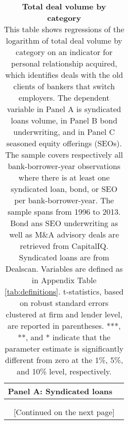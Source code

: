 \begin{table}[H] \begin{center} 
	\caption{\textbf{Total deal volume by category} \\ This table shows regressions of the logarithm of total deal volume by category on an indicator for personal relationship acquired, which identifies deals with the old clients of bankers that switch employers. The dependent variable in Panel A is syndicated loans volume, in Panel B bond underwriting, and in Panel C seasoned equity offerings (SEOs). The sample covers respectively all bank-borrower-year observations where there is at least one syndicated loan, bond, or SEO per bank-borrower-year. The sample spans from 1996 to 2013. Bond ans SEO underwriting as well as M\&A advisory deals are retrieved from CapitalIQ. Syndicated loans are from Dealscan. Variables are defined as in Appendix Table \ref{tab:definitions}. t-statistics, based on robust standard errors clustered at firm and lender level, are reported in parentheses. ***, **, and * indicate that the parameter estimate is significantly different from zero at the 1\%, 5\%, and 10\% level, respectively. } %
		\label{tab:main_dealsize_categ} 
	\begin{threeparttable} 
		\begin{tabular*}{\hsize}{@{\hskip\tabcolsep\extracolsep\fill}l*{5}{c}}
			\multicolumn{5}{l}{\textbf{Panel A}: Syndicated loans} \\
			\toprule  
				\def\sym#1{\ifmmode^{#1}\else\(^{#1}\)\fi}
				  \\
			\bottomrule \\  \multicolumn{6}{c}{[Continued on the next page]}  \end{tabular*}
			\end{threeparttable}   \end{center} \end{table}
\newpage
